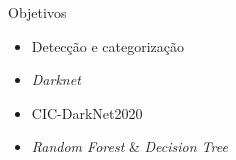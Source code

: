 \begin{frame}{Objetivos}

    \begin{itemize}
      \item Detecção e categorização \pause 
      \item \emph{Darknet} \pause 
      \item CIC-DarkNet2020 \pause 
      \item \emph{Random Forest} \& \emph{Decision Tree} 
    \end{itemize}

\end{frame}